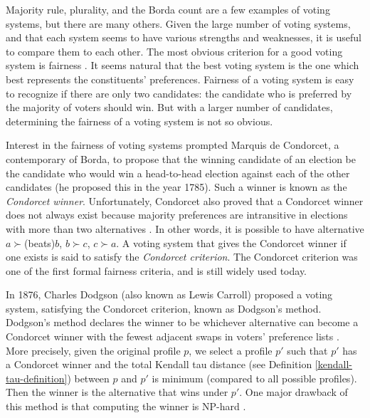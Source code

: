 	Majority rule, plurality, and the Borda count are a few examples of voting systems, but there are many others. Given the large number of voting systems, and that each system seems to have various strengths and weaknesses, it is useful to compare them to each other. The most obvious criterion for a good voting system is fairness \cite{chevaleyre2006issues}. It seems natural that the best voting system is the one which best represents the constituents' preferences. Fairness of a voting system is easy to recognize if there are only two candidates: the candidate who is preferred by the majority of voters should win. But with a larger number of candidates, determining the fairness of a voting system is not so obvious.

	Interest in the fairness of voting systems prompted Marquis de Condorcet, a contemporary of Borda, to propose that the winning candidate of an election be the candidate who would win a head-to-head election against each of the other candidates (he proposed this in the year 1785). Such a winner is known as the \emph{Condorcet winner}. Unfortunately, Condorcet also proved that a Condorcet winner does not always exist because majority preferences are intransitive in elections with more than two alternatives \cite{le1785essai, black1998theory}. In other words, it is possible to have alternative $a \succ $(beats)$ b$, $b \succ c$, $c \succ a$. A voting system that gives the Condorcet winner if one exists is said to satisfy the \emph{Condorcet criterion}. The Condorcet criterion was one of the first formal fairness criteria, and is still widely used today.

	In 1876, Charles Dodgson (also known as Lewis Carroll) proposed a voting system, satisfying the Condorcet criterion, known as Dodgson's method. Dodgson's method declares the winner to be whichever alternative can become a Condorcet winner with the fewest adjacent swaps in voters' preference lists \cite{dodgson1876method}. More precisely, given the original profile $p$, we select a profile $p'$ such that $p'$ has a Condorcet winner and the total Kendall tau distance (see Definition \ref{kendall-tau-definition}) between $p$ and $p'$ is minimum (compared to all possible profiles). Then the winner is the alternative that wins under $p'$. One major drawback of this method is that computing the winner is NP-hard \cite{bartholdi1989voting}.

